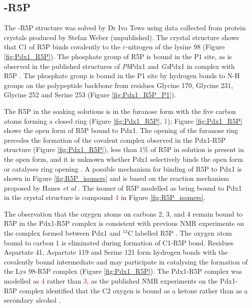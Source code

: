 \subsection{\atpdx -R5P}
The \atpdx -R5P structure was solved by Dr Ivo Tews using data collected from protein crystals produced by Stefan Weber (unpublished). The crystal structure shows that C1 of R5P binds covalently to the $\varepsilon$-nitrogen of the lysine 98 (Figure \ref{fig:Pdx1_R5P}). The phosphate group of R5P is bound in the P1 site, as is observed in the published structures of \textit{Pb}Pdx1 and \textit{Gs}Pdx1 in complex with R5P \cite{Guedez2012,Smith2015}. The phosphate group is bound in the P1 site by hydrogen bonds to N-H groups on the polypeptide backbone from residues Glycine 170, Glycine 231, Glycine 252 and Serine 253 (Figure \ref{fig:Pdx1_R5P_P1}). 

The R5P in the soaking solutions is in the furanose form with the five carbon atoms forming a closed ring (Figure \ref{fig:Pdx1_R5P}, \textcolor{red}{1}); Figure \ref{fig:Pdx1_R5P} shows the open form of R5P bound to Pdx1. The opening of the furanose ring precedes the formation of the covalent complex observed in the Pdx1-R5P structure (Figure \ref{fig:Pdx1_R5P}), less than 1\% of R5P in solution is present in the open form, and it is unknown whether Pdx1 selectively binds the open form or catalyses ring opening \cite{Pierce1984}. A possible mechanism for binding of R5P to Pdx1 is shown in Figure \ref{fig:R5P_isomers} and is based on the reaction mechanism proposed by Hanes \textit{et al} \cite{Hanes2008b}. The isomer of R5P modelled as being bound to Pdx1 in the crystal structure is compound \textcolor{red}{4} in Figure \ref{fig:R5P_isomers}.     



The observation that the oxygen atoms on carbons 2, 3, and 4 remain bound to R5P in the Pdx1-R5P complex is consistent with previous NMR experiments on the complex formed between Pdx1 and $^{13}$C labelled R5P \cite{Hanes2008b}. The oxygen atom bound to carbon 1 is eliminated during formation of C1-R5P bond. Residues Aspartate 41, Aspartate 119 and Serine 121 form hydrogen bonds with the covalently bound intermediate and may participate in catalysing the formation of the Lys 98-R5P complex (Figure \ref{fig:Pdx1_R5P}). The Pdx1-R5P complex was modelled as \textcolor{red}{4} rather than \textcolor{red}{3}, as the published NMR experiments on the Pdx1-R5P complex identified that the C2 oxygen is bound as a ketone rather than as a secondary alcohol \cite{Hanes2008b}. 
 
